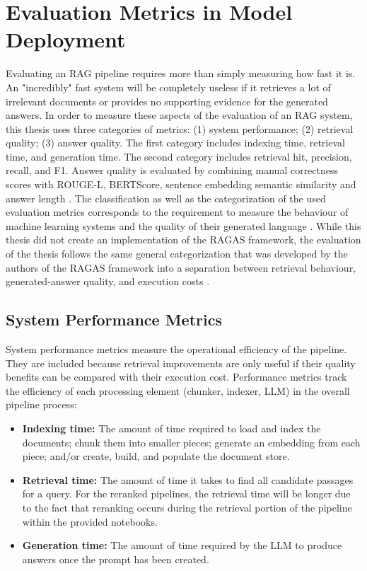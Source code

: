 \section{Evaluation Metrics in Model Deployment}

Evaluating an \ac{RAG} pipeline requires more than simply measuring how fast it is. An "incredibly" fast system will be completely useless if it retrieves a lot of irrelevant documents or provides no supporting evidence for the generated answers. In order to measure these aspects of the evaluation of an \ac{RAG} system, this thesis uses three categories of metrics: (1) system performance; (2) retrieval quality; (3) answer quality. The first category includes indexing time, retrieval time, and generation time. The second category includes retrieval hit, precision, recall, and F1. Answer quality is evaluated by combining manual correctness scores with \acs{ROUGE-L}, \acs{BERTScore}, sentence embedding semantic similarity and answer length \cite{lin2004rouge,zhang2020bertscore,reimers2019sentencebert}. The classification as well as the categorization of the used evaluation metrics corresponds to the requirement to measure the behaviour of machine learning systems and the quality of their generated language \cite{mlsystemsurvey2021,liang2022helm}. While this thesis did not create an implementation of the \ac{RAGAS} framework, the evaluation of the thesis follows the same general categorization that was developed by the authors of the \ac{RAGAS} framework into a separation between retrieval behaviour, generated-answer quality, and execution costs \cite{es2024ragas}.

\subsection{System Performance Metrics}

System performance metrics measure the operational efficiency of the pipeline. They are included because retrieval improvements are only useful if their quality benefits can be compared with their execution cost. Performance metrics track the efficiency of each processing element (chunker, indexer, LLM) in the overall pipeline process:

\begin{itemize}
    \item \textbf{Indexing time:} The amount of time required to load and index the documents; chunk them into smaller pieces; generate an embedding from each piece; and/or create, build, and populate the document store.
    \item \textbf{Retrieval time:} The amount of time it takes to find all candidate passages for a query. For the reranked pipelines, the retrieval time will be longer due to the fact that reranking occurs during the retrieval portion of the pipeline within the provided notebooks.
    \item \textbf{Generation time:} The amount of time required by the LLM to produce answers once the prompt has been created.
\end{itemize}

